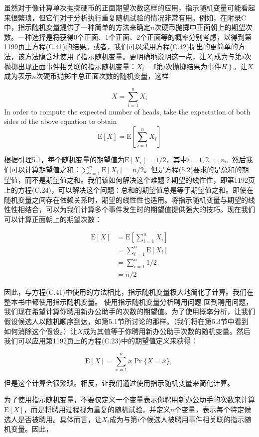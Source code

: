 \documentclass[lang=cn,newtx,10pt,scheme=chinese]{elegantbook}
\begin{document}
虽然对于像计算单次抛掷硬币的正面期望次数这样的应用，指示随机变量可能看起来很繁琐，但它们对于分析执行重复随机试验的情况非常有用。例如，在附录$\mathrm{C}$中，指示随机变量提供了一种简单的方法来确定$n$次硬币抛掷中正面朝上的期望次数。一种选择是将获得0个正面、1个正面、2个正面等的概率分别考虑，以得到第1199页上方程(C.41)的结果。或者，我们可以采用方程(C.42)提出的更简单的方法，该方法隐含地使用了指示随机变量。更明确地说明这一点，让$X_i$成为与第$i$次抛掷出现正面事件相关联的指示随机变量：$X_i=\mathrm{I}$第$i$次抛掷结果为事件$\left.H\right\}$。让$X$成为表示$n$次硬币抛掷中总正面次数的随机变量，这样

$$
X=\sum_{i=1}^n X_i
$$
In order to compute the expected number of heads, take the expectation of both sides of the above equation to obtain
$$
\mathrm{E}[X]=\mathrm{E}\left[\sum_{i=1}^n X_i\right]
$$

根据引理5.1，每个随机变量的期望值为$\mathrm{E}\left[X_i\right]=1 / 2$，其中$i=1,2, \ldots, n$。然后我们可以计算期望值之和：$\sum_{i=1}^n \mathrm{E}\left[X_i\right]=n / 2$。但是方程(5.2)要求的是总和的期望值，而不是期望值之和。我们该如何解决这个难题？期望的线性性，即第1192页上的方程(C.24)，可以解决这个问题：总和的期望值总是等于期望值之和。即使在随机变量之间存在依赖关系时，期望的线性性也适用。将指示随机变量与期望的线性性相结合，可以为我们计算多个事件发生时的期望值提供强大的技巧。现在我们可以计算正面朝上的期望次数：

$$
\begin{aligned}
\mathrm{E}[X] & =\mathrm{E}\left[\sum_{i=1}^n X_i\right] \\
& =\sum_{i=1}^n \mathrm{E}\left[X_i\right] \\
& =\sum_{i=1}^n 1 / 2 \\
& =n / 2
\end{aligned}
$$

因此，与方程(C.41)中使用的方法相比，指示随机变量极大地简化了计算。我们在整本书中都使用指示随机变量。
使用指示随机变量分析聘用问题
回到聘用问题，我们现在希望计算你聘用新办公助手的次数的期望值。为了使用概率分析，让我们假设候选人以随机顺序到达，如第5.1节所讨论的那样。（我们将在第5.3节中看到如何消除这个假设。）让$X$成为其值等于你聘用新办公助手次数的随机变量。然后我们可以应用第1192页上的方程(C.23)中的期望值定义来获得：

$$
\mathrm{E}[X]=\sum_{x=1}^n x \operatorname{Pr}\{X=x\} \text {, }
$$

但是这个计算会很繁琐。相反，让我们通过使用指示随机变量来简化计算。

为了使用指示随机变量，不要仅定义一个变量表示你聘用新办公助手的次数来计算$\mathrm{E}[X]$，而是将聘用过程视为重复的随机试验，并定义$n$个变量，表示每个特定候选人是否被聘用。具体而言，让$X_i$成为与第$i$个候选人被聘用事件相关联的指示随机变量。因此，
\end{document}

